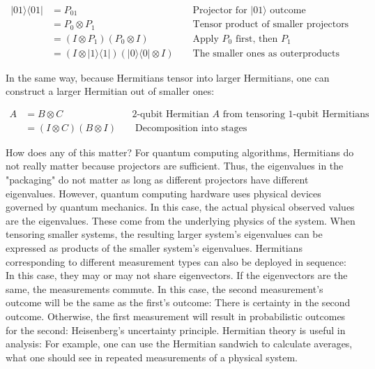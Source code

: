 \documentclass[main.tex]{subfiles}
\begin{document}
    $$
    \begin{aligned}
    |01\rangle\langle 01| &=P_{01} & & \text { Projector for }|01\rangle \text { outcome } \\
    &=P_{0} \otimes P_{1} & & \text { Tensor product of smaller projectors } \\
    &=\left(I \otimes P_{1}\right)\left(P_{0} \otimes I\right) & & \text { Apply } P_{0} \text { first, then } P_{1} \\
    &=(I \otimes|1\rangle\langle 1|)(|0\rangle\langle 0| \otimes I) & & \text { The smaller ones as outerproducts }
    \end{aligned}
    $$
    
    In the same way, because Hermitians tensor into larger Hermitians, one can construct a larger Hermitian out of smaller ones:
    
    $$
    \begin{aligned}
    A &=B \otimes C & & 2 \text {-qubit Hermitian } A \text { from tensoring 1-qubit Hermitians } \\
    &=(I \otimes C)(B \otimes I) & & \text { Decomposition into stages }
    \end{aligned}
    $$
    
    How does any of this matter? For quantum computing algorithms, Hermitians do not really matter because projectors are sufficient. Thus, the eigenvalues in the "packaging" do not matter as long as different projectors have different eigenvalues. However, quantum computing hardware uses physical devices governed by quantum mechanics. In this case, the actual physical observed values are the eigenvalues. These come from the underlying physics of the system. When tensoring smaller systems, the resulting larger system's eigenvalues can be expressed as products of the smaller system's eigenvalues. Hermitians corresponding to different measurement types can also be deployed in sequence: In this case, they may or may not share eigenvectors. If the eigenvectors are the same, the measurements commute. In this case, the second measurement's outcome will be the same as the first's outcome: There is certainty in the second outcome. Otherwise, the first measurement will result in probabilistic outcomes for the second: Heisenberg's uncertainty principle. Hermitian theory is useful in analysis: For example, one can use the Hermitian sandwich to calculate averages, what one should see in repeated measurements of a physical system.
\end{document}
